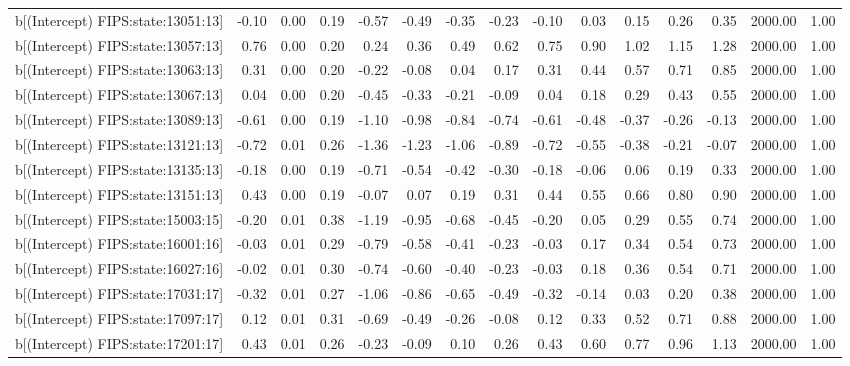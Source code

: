\begin{table}[ht]
\begin{tabular}{rrrrrrrrrrrrrrr}
  b[(Intercept) FIPS:state:13051:13] & -0.10 & 0.00 & 0.19 & -0.57 & -0.49 & -0.35 & -0.23 & -0.10 & 0.03 & 0.15 & 0.26 & 0.35 & 2000.00 & 1.00 \\ 
  b[(Intercept) FIPS:state:13057:13] & 0.76 & 0.00 & 0.20 & 0.24 & 0.36 & 0.49 & 0.62 & 0.75 & 0.90 & 1.02 & 1.15 & 1.28 & 2000.00 & 1.00 \\ 
  b[(Intercept) FIPS:state:13063:13] & 0.31 & 0.00 & 0.20 & -0.22 & -0.08 & 0.04 & 0.17 & 0.31 & 0.44 & 0.57 & 0.71 & 0.85 & 2000.00 & 1.00 \\ 
  b[(Intercept) FIPS:state:13067:13] & 0.04 & 0.00 & 0.20 & -0.45 & -0.33 & -0.21 & -0.09 & 0.04 & 0.18 & 0.29 & 0.43 & 0.55 & 2000.00 & 1.00 \\ 
  b[(Intercept) FIPS:state:13089:13] & -0.61 & 0.00 & 0.19 & -1.10 & -0.98 & -0.84 & -0.74 & -0.61 & -0.48 & -0.37 & -0.26 & -0.13 & 2000.00 & 1.00 \\ 
  b[(Intercept) FIPS:state:13121:13] & -0.72 & 0.01 & 0.26 & -1.36 & -1.23 & -1.06 & -0.89 & -0.72 & -0.55 & -0.38 & -0.21 & -0.07 & 2000.00 & 1.00 \\ 
  b[(Intercept) FIPS:state:13135:13] & -0.18 & 0.00 & 0.19 & -0.71 & -0.54 & -0.42 & -0.30 & -0.18 & -0.06 & 0.06 & 0.19 & 0.33 & 2000.00 & 1.00 \\ 
  b[(Intercept) FIPS:state:13151:13] & 0.43 & 0.00 & 0.19 & -0.07 & 0.07 & 0.19 & 0.31 & 0.44 & 0.55 & 0.66 & 0.80 & 0.90 & 2000.00 & 1.00 \\ 
  b[(Intercept) FIPS:state:15003:15] & -0.20 & 0.01 & 0.38 & -1.19 & -0.95 & -0.68 & -0.45 & -0.20 & 0.05 & 0.29 & 0.55 & 0.74 & 2000.00 & 1.00 \\ 
  b[(Intercept) FIPS:state:16001:16] & -0.03 & 0.01 & 0.29 & -0.79 & -0.58 & -0.41 & -0.23 & -0.03 & 0.17 & 0.34 & 0.54 & 0.73 & 2000.00 & 1.00 \\ 
  b[(Intercept) FIPS:state:16027:16] & -0.02 & 0.01 & 0.30 & -0.74 & -0.60 & -0.40 & -0.23 & -0.03 & 0.18 & 0.36 & 0.54 & 0.71 & 2000.00 & 1.00 \\ 
  b[(Intercept) FIPS:state:17031:17] & -0.32 & 0.01 & 0.27 & -1.06 & -0.86 & -0.65 & -0.49 & -0.32 & -0.14 & 0.03 & 0.20 & 0.38 & 2000.00 & 1.00 \\ 
  b[(Intercept) FIPS:state:17097:17] & 0.12 & 0.01 & 0.31 & -0.69 & -0.49 & -0.26 & -0.08 & 0.12 & 0.33 & 0.52 & 0.71 & 0.88 & 2000.00 & 1.00 \\ 
  b[(Intercept) FIPS:state:17201:17] & 0.43 & 0.01 & 0.26 & -0.23 & -0.09 & 0.10 & 0.26 & 0.43 & 0.60 & 0.77 & 0.96 & 1.13 & 2000.00 & 1.00 \\ 

\end{tabular}
\end{table}
